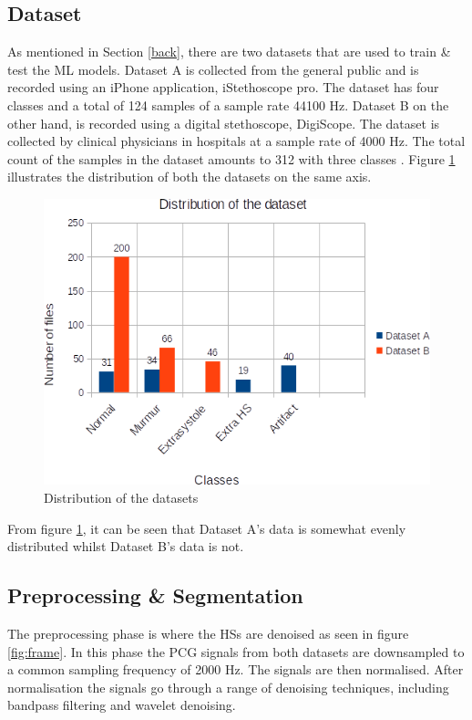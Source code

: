 \documentclass[10pt,twocolumn]{witseiepaper}
\begin{document}
\subsection{Dataset}
As mentioned in Section \ref{back}, there are two datasets that are used to train \& test the ML models. Dataset A is collected from the general public and is recorded using an iPhone application, iStethoscope pro. The dataset has four classes and a total of 124 samples of a sample rate 44100 Hz. Dataset B on the other hand, is recorded using a digital stethoscope, DigiScope. The dataset is collected by clinical physicians in hospitals at a sample rate of 4000 Hz. The total count of the samples in the dataset amounts to 312 with three classes \cite{bentley}. Figure \ref{fig:dist} illustrates the distribution of both the datasets on the same axis.

\begin{figure}[h!]
    \centering
    \includegraphics[scale=0.45]{./distribution.png}
    \caption{Distribution of the datasets}
    \label{fig:dist}
\end{figure}

From figure \ref{fig:dist}, it can be seen that Dataset A's data is somewhat evenly distributed whilst Dataset B's data is not.

\subsection{Preprocessing \& Segmentation}
\label{sec:preseg}
The preprocessing phase is where the HSs are denoised as seen in figure \ref{fig:frame}. In this phase the PCG signals from both datasets are downsampled to a common sampling frequency of 2000 Hz. The signals are then normalised. After normalisation the signals go through a range of denoising techniques, including bandpass filtering and wavelet denoising. 
\end{document}

